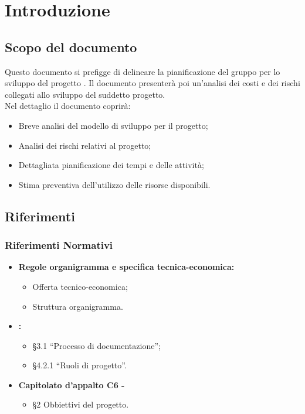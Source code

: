 \documentclass[PianoDiProgetto.tex]{subfiles}
\begin{document}
\chapter{Introduzione}

\section{Scopo del documento}
Questo documento si prefigge di delineare la pianificazione del gruppo \gruppo per lo sviluppo del progetto \progetto. Il documento presenterà poi un'analisi dei costi e dei rischi collegati allo sviluppo del suddetto progetto.\\
Nel dettaglio il documento coprirà:
\begin{itemize}
	\item Breve analisi del modello di sviluppo per il progetto;
	\item Analisi dei rischi relativi al progetto;
	\item Dettagliata pianificazione dei tempi e delle attività;
	\item Stima preventiva dell'utilizzo delle risorse disponibili.
\end{itemize}

\scopoProdotto

\glossExpl

\section{Riferimenti}
\subsection{Riferimenti Normativi}
\begin{itemize}
	\item \textbf{Regole organigramma e specifica tecnica-economica:} \\
		  \begin{itemize}
		  	\item Offerta tecnico-economica;
		  	\item Struttura organigramma.
		  \end{itemize}
	\item \textbf{\ndp \vrtre:}
	 \begin{itemize}
	 	\item \S3.1 ``Processo di documentazione'';
	  	\item \S4.2.1 ``Ruoli di progetto''.
	 \end{itemize}
 	\item \textbf{Capitolato d'appalto C6 - \progetto}\\
 		\begin{itemize}
 			\item \S2 Obbiettivi del progetto.
 		\end{itemize}
	
\end{itemize}
\end{document}
